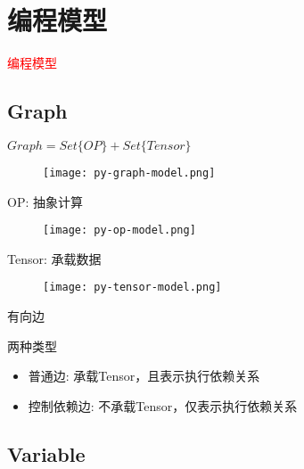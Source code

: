 \section{编程模型}
\label{sec:prog-model}

\begin{frame}
  \begin{center}
    \Huge{\textcolor{red}{编程模型}}
  \end{center}
\end{frame}

\subsection{Graph}

\begin{frame}{$ Graph = Set\{OP\} + Set\{Tensor\} $}
  \begin{figure}
    \centering
    \texttt{[image: py-graph-model.png]}
  \end{figure}
\end{frame}

\begin{frame}{OP: 抽象计算}
  \begin{figure}
    \centering
    \texttt{[image: py-op-model.png]}
  \end{figure}
\end{frame}

\begin{frame}{Tensor: 承载数据}
  \begin{figure}
    \centering
    \texttt{[image: py-tensor-model.png]}
  \end{figure}
\end{frame}

\begin{frame}{有向边}
  \begin{block}{两种类型}
    \begin{itemize}
      \item \alert{普通边}: 承载Tensor，且表示执行依赖关系
      \item \alert{控制依赖边}: 不承载Tensor，仅表示执行依赖关系  
    \end{itemize}
  \end{block}
\end{frame}

\subsection{Variable}

